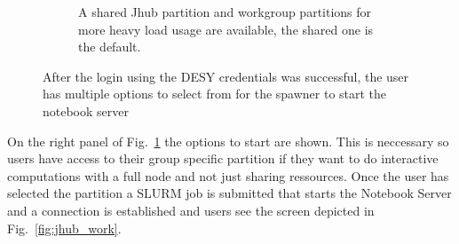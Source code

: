 \documentclass[10pt]{scrartcl}
\begin{document}
\begin{figure}
\begin{subfigure}{0.45\textwidth}
	  \caption{A shared Jhub partition and workgroup partitions for more heavy load usage are available, the shared one is the default.} %
  \end{subfigure}
  \caption{After the login using the DESY credentials was successful, the user has multiple options to select from for the spawner to start the notebook server}
  \label{fig:jhub_spawn}
\end{figure}
%
On the right panel of Fig.~\ref{fig:jhub_spawn} the options to start are shown.
This is neccessary so users have access to their group specific partition if they want to do interactive computations with a full node and not just sharing ressources.
Once the user has selected the partition a SLURM job is submitted that starts the Notebook Server and a connection is established and users see the screen depicted in Fig.~\ref{fig:jhub_work}.
%
\end{document}
